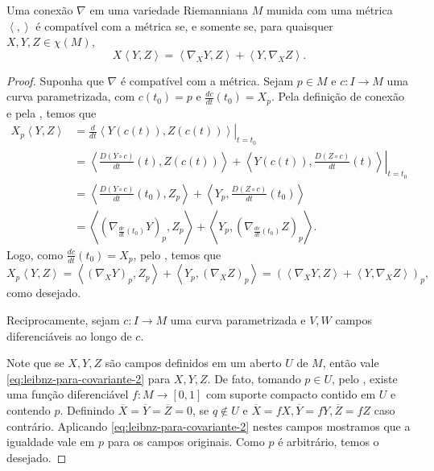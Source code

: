 \begin{corollary}
	\label{cor:leibniz-direcional}
	Uma conexão $\nabla$ em uma variedade Riemanniana $M$ munida com uma métrica $\left<,\right>$ é compatível com a métrica se, e somente se, para quaisquer $X, Y, Z \in \chi(M)$,
	\begin{equation}
		\label{eq:leibnz-para-covariante-2}
		X\left<Y,Z\right> =\left<\nabla_{X}Y,Z\right> +\left<Y,\nabla_{X}Z\right> .
	\end{equation}
	\begin{proof}

		Suponha que $\nabla$ é compatível com a métrica. Sejam $p \in M$ e $c:I\to M$ uma curva parametrizada, com $c(t_{0})=p$ e $\frac{dc}{dt}(t_{0})=X_{p}$. Pela definição de conexão e pela , temos que
		\begin{align*}
			X_{p}\left<Y,Z\right> & =\left.\frac{d}{dt}\left<Y(c(t)),Z(c(t))\right>\right|_{t=t_{0}}                                                                              \\
			                      & =\left<\left.\frac{D(Y \circ  c)}{dt}(t),Z(c(t))\right> +\left<Y(c(t)),\frac{D(Z \circ c)}{dt}(t)\right> \right|_{t=t_{0}}                    \\
			                      & =\left<\frac{D(Y \circ  c)}{dt}(t_{0}),Z_{p}\right> +\left<Y_{p},\frac{D(Z \circ c)}{dt}(t_{0})\right>                                        \\
			                      & = \left<\left( \nabla_{\frac{dc}{dt}(t_{0})}Y \right)_{p},Z_{p}\right> +\left<Y_{p},\left( \nabla_{\frac{dc}{dt}(t_{0})}Z \right)_{p}\right>.
		\end{align*}
		Logo, como $\frac{dc}{dt}(t_{0})=X_{p}$, pelo , temos que
		\begin{equation*}
			X_{p}\left<Y,Z\right> =\left<(\nabla_{X}Y)_{p},Z_{p}\right> + \left<Y_{p},(\nabla _{X}Z)_{p}\right> =(\left<\nabla_{X}Y,Z\right> +\left<Y,\nabla_{X}Z\right> )_{p},
		\end{equation*}
		como desejado.

		Reciprocamente, sejam $c:I\to M$ uma curva parametrizada e $V, W$ campos diferenciáveis ao longo de $c$.

		Note que se $X,Y,Z$ são campos definidos em um aberto $U$ de $M$, então vale \eqref{eq:leibnz-para-covariante-2} para $X,Y,Z$. De fato, tomando $p \in U$, pelo , existe uma função diferenciável $f:M\to [0,1]$ com suporte compacto contido em $U$ e contendo $p$. Definindo $\overline{X} =\overline{Y} =\overline{Z}=0$, se $q \not\in U$ e $\overline{X}=fX, \overline{Y}=fY, \overline{Z}=fZ$ caso contrário. Aplicando \eqref{eq:leibnz-para-covariante-2} nestes campos mostramos que a igualdade vale em $p$ para os campos originais. Como $p$ é arbitrário, temos o desejado.


\end{proof}
\end{corollary}
